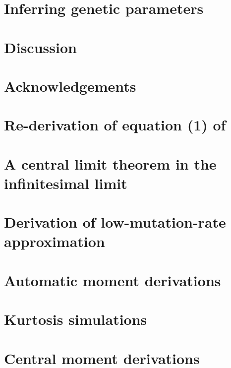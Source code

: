 \documentclass{article}
\newcommand{\beginsupplement}{%
        \setcounter{table}{0}
        \renewcommand{\thetable}{S\arabic{table}}%
        \setcounter{figure}{0}
        \renewcommand{\thefigure}{S\arabic{figure}}%
     }
\begin{document}
\section{Inferring genetic parameters}

\section{Discussion}

\section*{Acknowledgements}

 

\clearpage

\appendix
\beginsupplement

\section{Re-derivation of equation (1) of \citet{Schraiber2015}}

\section{A central limit theorem in the infinitesimal limit}
\label{clt}

\section{Derivation of low-mutation-rate approximation}
\label{lmr_der}

\section{Automatic moment derivations}
\label{symmath}

\section{Kurtosis simulations}
\label{kurtsim}

\section{Central moment derivations}
\label{moments}

\end{document}
